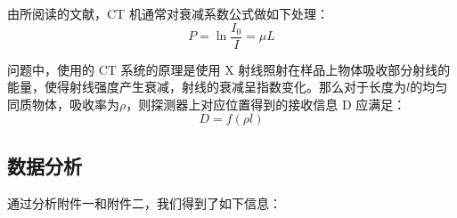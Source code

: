 \documentclass[12pt]{ctexart}
\begin{document}
	由所阅读的文献，CT 机通常对衰减系数公式做如下处理：
	\begin{equation}
		P = \ln \frac{I_0}{I} = \mu L
	\end{equation}
	
	问题中，使用的 CT 系统的原理是使用 X 射线照射在样品上物体吸收部分射线的能量，使得射线强度产生衰减，射线的衰减呈指数变化。那么对于长度为$l$的均匀同质物体，吸收率为$\rho$，则探测器上对应位置得到的接收信息 D 应满足：
	\begin{equation}
		D = f(\rho l)
		\label{D}
	\end{equation}
	
	\subsection{数据分析}
	
	通过分析附件一和附件二，我们得到了如下信息：
\end{document}

